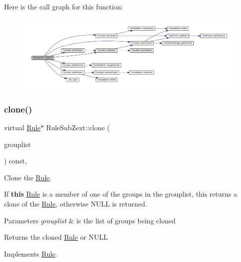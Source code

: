 Here is the call graph for this function\+:
\nopagebreak
\begin{figure}[H]
\begin{center}
\leavevmode
\includegraphics[width=350pt]{class_rule_sub_zext_abefcd055ea0199a4cf71e5f310996d9b_cgraph}
\end{center}
\end{figure}
\mbox{\label{class_rule_sub_zext_af5aa330b8a18e0491fde11acef8fd853}} 
\subsubsection{\texorpdfstring{clone()}{clone()}}
{\footnotesize\ttfamily virtual \mbox{\hyperlink{class_rule}{Rule}}$\ast$ Rule\+Sub\+Zext\+::clone (\begin{DoxyParamCaption}\item[{const \mbox{\hyperlink{class_action_group_list}{Action\+Group\+List}} \&}]{grouplist }\end{DoxyParamCaption}) const\hspace{0.3cm}{\ttfamily [inline]}, {\ttfamily [virtual]}}



Clone the \mbox{\hyperlink{class_rule}{Rule}}. 

If {\bfseries{this}} \mbox{\hyperlink{class_rule}{Rule}} is a member of one of the groups in the grouplist, this returns a clone of the \mbox{\hyperlink{class_rule}{Rule}}, otherwise N\+U\+LL is returned. 
\begin{DoxyParams}{Parameters}
{\em grouplist} & is the list of groups being cloned \\
\hline
\end{DoxyParams}
\begin{DoxyReturn}{Returns}
the cloned \mbox{\hyperlink{class_rule}{Rule}} or N\+U\+LL 
\end{DoxyReturn}


Implements \mbox{\hyperlink{class_rule_a70de90a76461bfa7ea0b575ce3c11e4d}{Rule}}.



